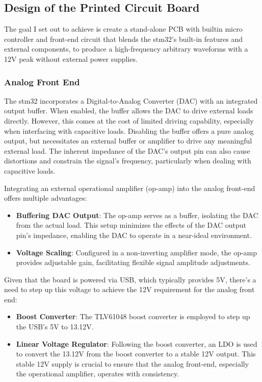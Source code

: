 \subsection{Design of the Printed Circuit Board}

The goal I set out to achieve is create a stand-alone PCB with builtin micro controller and front-end circuit that blends the stm32's built-in features and external components, to produce a high-frequency arbitrary waveforms with a 12V peak without external power supplies.

\subsubsection{Analog Front End}

The stm32 incorporates a Digital-to-Analog Converter (DAC) with an integrated output buffer. When enabled, the buffer allows the DAC to drive external loads directly. However, this comes at the cost of limited driving capability, especially when interfacing with capacitive loads. Disabling the buffer offers a pure analog output, but necessitates an external buffer or amplifier to drive any meaningful external load. The inherent impedance of the DAC's output pin can also cause distortions and constrain the signal's frequency, particularly when dealing with capacitive loads.

\bigbreak

Integrating an external operational amplifier (op-amp) into the analog front-end offers multiple advantages:
\begin{itemize}
      \item  \textbf{Buffering DAC Output}: The op-amp serves as a buffer, isolating the DAC from the actual load. This setup minimizes the effects of the DAC output pin's impedance, enabling the DAC to operate in a near-ideal environment.
      \item \textbf{Voltage Scaling}: Configured in a non-inverting amplifier mode, the op-amp provides adjustable gain, facilitating flexible signal amplitude adjustments.
\end{itemize}

Given that the board is powered via USB, which typically provides 5V, there's a need to step up this voltage to achieve the 12V requirement for the analog front end:
\begin{itemize}
      \item \textbf{Boost Converter}: The TLV61048 boost converter is employed to step up the USB's 5V to 13.12V.
      \item \textbf{Linear Voltage Regulator}: Following the boost converter, an LDO is used to convert the 13.12V from the boost converter to a stable 12V output. This stable 12V supply is crucial to ensure that the analog front-end, especially the operational amplifier, operates with consistency.
\end{itemize}


